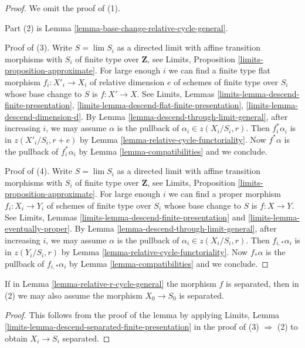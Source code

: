 \begin{proof}
We omit the proof of (1).

\medskip\noindent
Part (2) is Lemma \ref{lemma-base-change-relative-cycle-general}.

\medskip\noindent
Proof of (3). Write $S = \lim S_i$ as a directed limit with
affine transition morphisms with $S_i$ of finite type over $\mathbf{Z}$,
see Limits, Proposition \ref{limits-proposition-approximate}.
For large enough $i$ we can find a finite type flat morphism
$f_i : X'_i \to X_i$ of relative dimension $e$ of schemes of
finite type over $S_i$ whose base change to $S$ is $f : X' \to X$.
See
Limits, Lemmas
\ref{limits-lemma-descend-finite-presentation},
\ref{limits-lemma-descend-flat-finite-presentation},
\ref{limits-lemma-descend-dimension-d}.
By Lemma \ref{lemma-descend-through-limit-general},
after increasing $i$, we may assume $\alpha$
is the pullback of $\alpha_i \in z(X_i/S_i, r)$. Then
$f_i^*\alpha_i$ is in $z(X'_i/S_i, r + e)$ by
Lemma \ref{lemma-relative-cycle-functoriality}.
Now $f^*\alpha$ is the pullback of $f_i^*\alpha_i$ by
Lemma \ref{lemma-compatibilities} and we conclude.

\medskip\noindent
Proof of (4). Write $S = \lim S_i$ as a directed limit with
affine transition morphisms with $S_i$ of finite type over $\mathbf{Z}$,
see Limits, Proposition \ref{limits-proposition-approximate}.
For large enough $i$ we can find a proper morphism
$f_i : X_i \to Y_i$ of schemes of finite type over $S_i$
whose base change to $S$ is $f : X \to Y$. See
Limits, Lemmas
\ref{limits-lemma-descend-finite-presentation} and
\ref{limits-lemma-eventually-proper}.
By Lemma \ref{lemma-descend-through-limit-general}, after increasing $i$,
we may assume $\alpha$ is the pullback of $\alpha_i \in z(X_i/S_i, r)$. Then
$f_{i, *}\alpha_i$ is in $z(Y_i/S_i, r)$ by
Lemma \ref{lemma-relative-cycle-functoriality}.
Now $f_*\alpha$ is the pullback of $f_{i, *}\alpha_i$ by
Lemma \ref{lemma-compatibilities} and we conclude.
\end{proof}

\begin{lemma}
\label{lemma-relative-r-cycle-general-bis}
If in Lemma \ref{lemma-relative-r-cycle-general} the morphism $f$ is
separated, then in (2) we may also assume the morphism $X_0 \to S_0$ is
separated.
\end{lemma}

\begin{proof}
This follows from the proof of the lemma by applying
Limits, Lemma \ref{limits-lemma-descend-separated-finite-presentation}
in the proof of (3) $\Rightarrow$ (2) to obtain $X_i \to S_i$ separated.
\end{proof}

